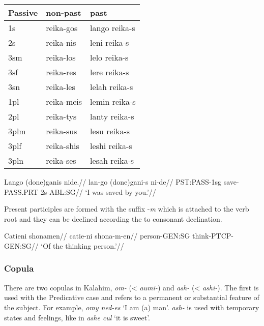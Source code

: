 \documentclass[
  a4paper,
]{article}
\begin{document}
\begin{longtable}[]{@{}lll@{}}
\toprule
Passive & non-past & past \\
\midrule
\endhead
1s & reika-gos & lango reika-s \\
2s & reika-nis & leni reika-s \\
3sm & reika-los & lelo reika-s \\
3sf & reika-res & lere reika-s \\
3sn & reika-les & lelah reika-s \\
1pl & reika-meis & lemin reika-s \\
2pl & reika-tys & lanty reika-s \\
3plm & reika-sus & lesu reika-s \\
3plf & reika-shis & leshi reika-s \\
3pln & reika-ses & lesah reika-s \\
\bottomrule
\end{longtable}

\ex \begingl \glpreamble Lango (done)ganis nide.// \gla lan-go
(done)gani-s ni-de// \glb PST:PASS-1sg save-PASS.PRT 2s-ABL:SG//
\glft `I was saved by you.'// \endgl \xe

Present participles are formed with the suffix -\emph{m} which is
attached to the verb root and they can be declined according the to
consonant declination.

\ex \begingl \glpreamble Catieni shonamen// \gla catie-ni shona-m-en//
\glb person-GEN:SG think-PTCP-GEN:SG// \glft `Of the thinking person.'//
\endgl \xe

\hypertarget{copula}{%
\subsubsection{Copula}\label{copula}}

There are two copulas in Kalahim, \emph{om-} (\textless{} \emph{aumi-})
and \emph{ash-} (\textless{} \emph{ashi-}). The first is used with the
Predicative case and refers to a permanent or substantial feature of the
subject. For example, \emph{omy ned-es} `I am (a) man'. \emph{ash-} is
used with temporary states and feelings, like in \emph{ashe cul} `it is
sweet'.
\end{document}
